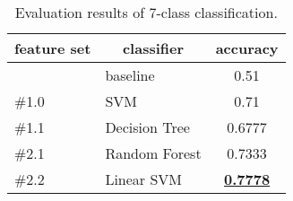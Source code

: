 \begin{table}[h]
\centering
\begin{tabular}{|l|l|c|}
\hline
\multicolumn{1}{|c|}{\textbf{feature set}} & \multicolumn{1}{c|}{\textbf{classifier}} & \textbf{accuracy} \\ \hline
 & baseline & 0.51 \\ \hline
\#1.0 & SVM & 0.71 \\ \hline
\#1.1 & Decision Tree & 0.6777 \\ \hline
\#2.1 & Random Forest & 0.7333 \\ \hline
\#2.2 & Linear SVM & {\ul \textbf{0.7778}} \\ \hline
\end{tabular}
\caption{Evaluation results of 7-class classification.}
\label{tab:7class}
\end{table}
